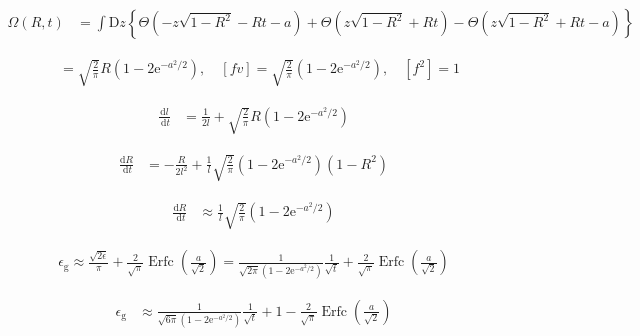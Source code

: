 \documentclass{article}
\begin{document}
\begin{align*}
\Omega(R, t) &= \int \mathrm{D} z \left\{\Theta\left(-z \sqrt{1 - R^{2}} - R t - a\right) + \Theta\left(z \sqrt{1 - R^{2}} + R t\right) - \Theta\left(z \sqrt{1 - R^{2}} + R t - a\right)\right\} \tag{8.99}
\end{align*}

\begin{align*}
[f u] &= \sqrt{\frac{2}{\pi}} R \left(1 - 2 \mathrm{e}^{-a^{2}/2}\right), \quad [f v] = \sqrt{\frac{2}{\pi}} \left(1 - 2 \mathrm{e}^{-a^{2}/2}\right), \quad \left[f^{2}\right] = 1 \tag{8.100}
\end{align*}

\begin{align*}
\frac{\mathrm{d} l}{\mathrm{~d} t} &= \frac{1}{2 l} + \sqrt{\frac{2}{\pi}} R \left(1 - 2 \mathrm{e}^{-a^{2}/2}\right) \tag{8.101}
\end{align*}

\begin{align*}
\frac{\mathrm{d} R}{\mathrm{~d} t} &= -\frac{R}{2 l^{2}} + \frac{1}{l} \sqrt{\frac{2}{\pi}} \left(1 - 2 \mathrm{e}^{-a^{2}/2}\right) \left(1 - R^{2}\right) \tag{8.102}
\end{align*}

\begin{align*}
\frac{\mathrm{d} R}{\mathrm{~d} t} &\approx \frac{1}{l} \sqrt{\frac{2}{\pi}} \left(1 - 2 \mathrm{e}^{-a^{2}/2}\right) \tag{8.103}
\end{align*}

\begin{align*}
\epsilon_{\mathrm{g}} \approx \frac{\sqrt{2 \epsilon}}{\pi}+\frac{2}{\sqrt{\pi}} \operatorname{Erfc}\left(\frac{a}{\sqrt{2}}\right) =\frac{1}{\sqrt{2 \pi}\left(1-2 \mathrm{e}^{-a^{2} / 2}\right)} \frac{1}{\sqrt{t}}+\frac{2}{\sqrt{\pi}} \operatorname{Erfc}\left(\frac{a}{\sqrt{2}}\right)
\tag{8.104}
\end{align*}

\begin{align*}
\epsilon_{\mathrm{g}} &\approx \frac{1}{\sqrt{6 \pi} \left(1 - 2 \mathrm{e}^{-a^{2}/2}\right)} \frac{1}{\sqrt{t}} + 1 - \frac{2}{\sqrt{\pi}} \operatorname{Erfc}\left(\frac{a}{\sqrt{2}}\right) \tag{8.105}
\end{align*}
\end{document}
